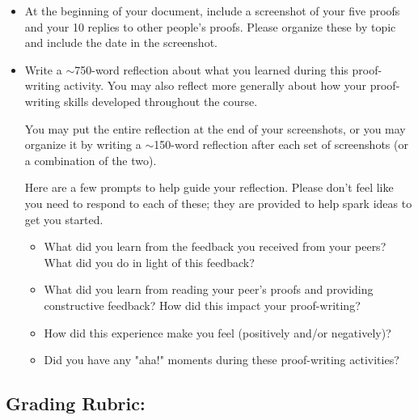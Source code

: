 \begin{itemize}

\item At the beginning of your document, include a screenshot of your five proofs and your 10 replies to other people's proofs. Please organize these by topic and include the date in the screenshot.

\item Write a $\sim$750-word reflection about what you learned during this proof-writing activity. You may also reflect more generally about how your proof-writing skills developed throughout the course.

    You may put the entire reflection at the end of your screenshots, or you may organize it by writing a $\sim$150-word reflection after each set of screenshots (or a combination of the two).

    Here are a few prompts to help guide your reflection. Please don't feel like you need to respond to each of these; they are provided to help spark ideas to get you started.

    \begin{itemize}
    \item What did you learn from the feedback you received from your peers? What did you do in light of this feedback?

    \item What did you learn from reading your peer's proofs and providing constructive feedback? How did this impact your proof-writing?

    \item How did this experience make you feel (positively and/or negatively)?

    \item Did you have any "aha!" moments during these proof-writing activities?

    \end{itemize}


\end{itemize}




\subsection*{Grading Rubric:}

